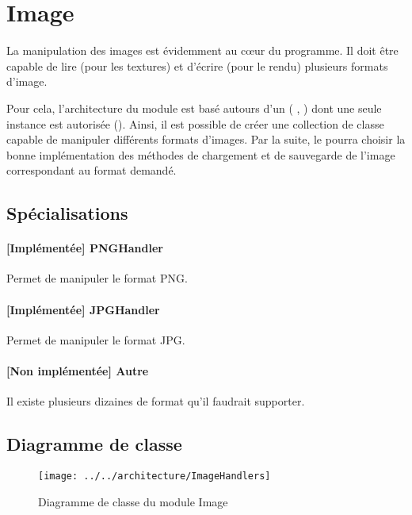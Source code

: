 \section{Image}
La manipulation des images est évidemment au cœur du programme. Il doit être
capable de lire (pour les textures) et d'écrire (pour le rendu) plusieurs
formats d'image.

Pour cela, l'architecture du module est basé autours d'un  (\cf
\cite{DesignPatternsBook}, ) dont une seule instance est autorisée
(). Ainsi, il est possible de créer une
collection de classe capable de manipuler différents formats d'images. Par la
suite, le  pourra choisir la bonne implémentation des méthodes de
chargement et de sauvegarde de l'image correspondant au format demandé.

\subsection{Spécialisations}
\paragraph{[Implémentée] PNGHandler} Permet de manipuler le format PNG.

\paragraph{[Implémentée] JPGHandler} Permet de manipuler le format JPG. 

\paragraph{[Non implémentée] Autre} Il existe plusieurs dizaines de format
qu'il faudrait supporter.

\subsection{Diagramme de classe}
\begin{figure}[h]
\begin{center}
  \texttt{[image: ../../architecture/ImageHandlers]}
  \caption{Diagramme de classe du module Image\label{fig:CDImageHandlers}}
\end{center}
\end{figure}
